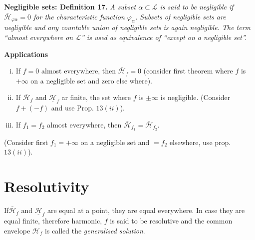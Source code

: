\noindent 
\textbf{Negligible sets: Definition 17.}\label{p4:chap5:sec23:def17} %
\textit{A subset $\alpha \subset \mathscr{L}$ is said to be negligible if
$\bar{\mathscr{H}}_{\varphi \alpha} = 0$ for the characteristic
function $\varphi_\alpha$. Subsets of negligible sets are negligible
and any countable union of negligible sets is again negligible. The
term ``almost everywhere on $\mathscr{L}$'' is used as equivalence of
``except on a negligible set''.} 

\medskip
\noindent 
\textbf{Applications}
\begin{enumerate}[(i)]
\item If $f = 0$ almost everywhere, then $\bar{\mathscr{H}}_{f} = 0$
  (consider first theorem where $f$ is $+ \infty$ on a negligible set
  and zero else where).	 
\item If $\bar{\mathscr{H}}_{f}$ and $\underline{\mathscr{H}}_{f}$ ar
  finite, the set where $f$ is $\pm \infty$ is negligible. (Consider
  $f + (-f)$ and use Prop. $13 (ii)$). 
\item If $f_1 = f_2$ almost everywhere, then $\bar{\mathscr{H}}_{f_1}
  = \bar{\mathscr{H}}_{f_2}$.  
\end{enumerate}

(Consider first $f_1 = + \infty$ on a negligible set and $= f_2 $
elsewhere, use prop. $13 (ii)$). 

\section{Resolutivity}\label{p4:chap5:sec24} %

\setcounter{defn}{17}
\begin{defn}\label{p4:chap5:sec24:def18} %
  If\pageoriginale $\bar{\mathscr{H}}_{f}$ and $\underline{\mathscr{H}}_{f}$ are
  equal at a point, they are equal everywhere. In case they are equal
  finite, therefore harmonic, $f$ is said to be resolutive and the
  common envelope $\mathscr{H}_f$ is called the {\em generalised
    solution}. 	 
\end{defn}

